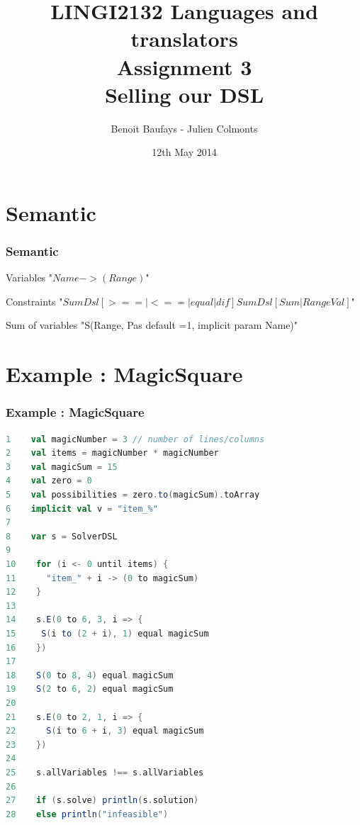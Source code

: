 \documentclass[usenames,dvipsnames]{beamer}
\title[LINGI2132 Assignment 3]{LINGI2132 Languages and translators \\ Assignment 3 \\ Selling our DSL} %
\author[Baufays - Colmonts] {Benoit Baufays - Julien Colmonts} %
\institute[INGI] %
{
Université Catholique de Louvain - INGI\\ %
\medskip
}
\date{12th May 2014} %
\begin{document}
\begin{frame}
\titlepage %
\end{frame}

\section{Semantic}
\begin{frame}
\frametitle{Semantic}
\begin{block}{Variables}
\center "$Name -> (Range)$"
\end{block}
\hspace{1cm}
\begin{block}{Constraints}
\center "$SumDsl [>==|<==|equal|dif] SumDsl [Sum|RangeVal]$"
\end{block}
\hspace{1cm}
\begin{block}{Sum of variables}
\center "S(Range, Pas default =1, implicit param Name)"
\end{block}


\end{frame}

\section{Example : MagicSquare}
\begin{frame}[fragile]
\frametitle{Example : MagicSquare}
\begin{lstlisting}[language=scala]
1    val magicNumber = 3 // number of lines/columns
2    val items = magicNumber * magicNumber
3    val magicSum = 15
4    val zero = 0
5    val possibilities = zero.to(magicSum).toArray
6    implicit val v = "item_%"
7
8    var s = SolverDSL
9
10    for (i <- 0 until items) {
11      "item_" + i -> (0 to magicSum)
12    }
13
14    s.E(0 to 6, 3, i => {
15     S(i to (2 + i), 1) equal magicSum
16    })
17
18    S(0 to 8, 4) equal magicSum
19    S(2 to 6, 2) equal magicSum
20
21    s.E(0 to 2, 1, i => {
22      S(i to 6 + i, 3) equal magicSum
23    })
24
25    s.allVariables !== s.allVariables
26
27    if (s.solve) println(s.solution)
28    else println("infeasible")
\end{lstlisting}
\end{frame}
\end{document}
